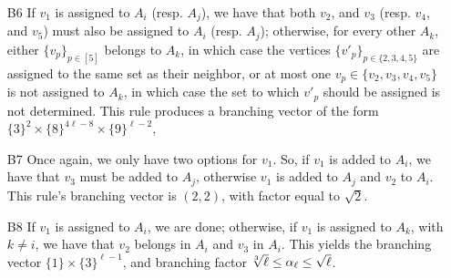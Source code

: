 \begin{itemize}
	\item[B6] If $v_1$ is assigned to $A_i$ (resp. $A_j$), we have that both $v_2$, and $v_3$ (resp. $v_4$, and $v_5$) must also be assigned to $A_i$ (resp. $A_j$);
	otherwise, for every other $A_k$, either $\{v_{p}\}_{p \in [5]}$ belongs to $A_k$, in which case the vertices $\{v'_{p}\}_{p \in \{2,3,4,5\}}$ are assigned to the same set as their neighbor, or at most one $v_p \in \{v_2, v_3, v_4, v_5\}$ is not assigned to $A_k$, in which case the set to which $v'_p$ should be assigned is not determined.
	This rule produces a branching vector of the form $\{3\}^2 \times \{8\}^{4\ell - 8} \times \{9\}^{\ell - 2}$, 
	
	\item[B7] Once again, we only have two options for $v_1$.
	So, if $v_1$ is added to $A_i$, we have that $v_3$ must be added to $A_j$, otherwise $v_1$ is added to $A_j$ and $v_2$ to $A_i$.
	This rule's branching vector is $(2, 2)$, with factor equal to $\sqrt{2}$.
	
	\item[B8] If $v_1$ is assigned to $A_i$, we are done; otherwise, if $v_1$ is assigned to $A_k$, with $k \neq i$, we have that $v_2$ belongs in $A_i$ and $v_3$ in $A_i$.
	This yields the branching vector $\{1\} \times \{3\}^{\ell-1}$, and branching factor $\sqrt[\leftroot{2} 3]{\ell} \leq \alpha_\ell \leq \sqrt{\ell}$.
\end{itemize}

